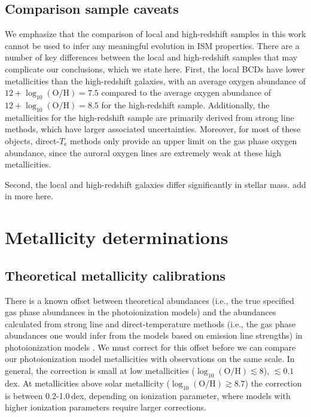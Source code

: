 \documentclass[preprint2]{aastex62}
\newcommand{\logten}{\ensuremath{\log_{10}}}
\newcommand{\logOH}{\ensuremath{\logten (\mathrm{O}/\mathrm{H})}\xspace}
\newcommand{\Te}{\ensuremath{T_{\mathrm{e}}}\xspace}
\newcommand{\XXX}{{\bf \color{red}{XXX} }}
\begin{document}
\subsection{Comparison sample caveats}\label{sec:data:caveats}

We emphasize that the comparison of local and high-redshift samples in this work cannot be used to infer any meaningful evolution in ISM properties. There are a number of key differences between the local and high-redshift samples that may complicate our conclusions, which we state here. First, the local BCDs have lower metallicities than the high-redshift galaxies, with an average oxygen abundance of $12+\logOH = 7.5$ compared to the average oxygen abundance of $12+\logOH = 8.5$ for the high-redshift sample. Additionally, the metallicities for the high-redshift sample are primarily derived from strong line methods, which have larger associated uncertainties. Moreover, for most of these objects, direct-\Te methods only provide an upper limit on the gas phase oxygen abundance, since the auroral oxygen lines are extremely weak at these high metallicities.

Second, the local and high-redshift galaxies differ significantly in stellar mass. \XXX add in more here.

\section{Metallicity determinations}\label{sec:Z}

\subsection{Theoretical metallicity calibrations}\label{sec:Z:corr}

There is a known offset between theoretical abundances (i.e., the true specified gas phase abundances in the photoionization models) and the abundances calculated from strong line and direct-temperature methods (i.e., the gas phase abundances one would infer from the models based on emission line strengths) in photoionization models \citep{Kewley+2008}. We must correct for this offset before we can compare our photoionization model metallicities with observations on the same scale. In general, the correction is small at low metallicities (\logOH$ \lesssim 8$), $\lesssim 0.1$\,dex. At metallicities above solar metallicity (\logOH$\gtrsim 8.7$) the correction is between 0.2-1.0\,dex, depending on ionization parameter, where models with higher ionization parameters require larger corrections.
\end{document}
